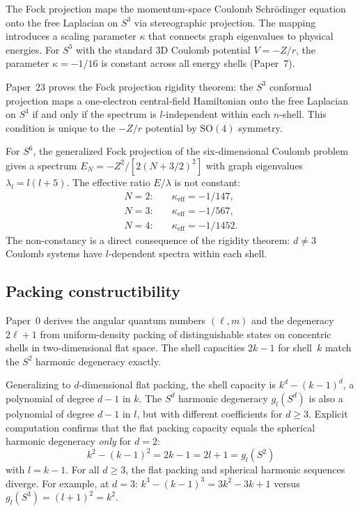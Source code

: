 \documentclass[twocolumn,pra,amsmath,amssymb,superscriptaddress]{revtex4-2}
\begin{document}
The Fock projection maps the momentum-space Coulomb Schr\"odinger
equation onto the free Laplacian on $S^3$ via stereographic
projection.  The mapping introduces a scaling parameter $\kappa$
that connects graph eigenvalues to physical energies.  For $S^3$
with the standard 3D Coulomb potential $V = -Z/r$, the parameter
$\kappa = -1/16$ is constant across all energy shells (Paper~7).

Paper~23 proves the Fock projection rigidity theorem: the $S^3$
conformal projection maps a one-electron central-field Hamiltonian
onto the free Laplacian on $S^3$ if and only if the spectrum is
$l$-independent within each $n$-shell.  This condition is unique
to the $-Z/r$ potential by $\mathrm{SO}(4)$ symmetry.

For $S^6$, the generalized Fock projection of the six-dimensional
Coulomb problem gives a spectrum $E_N = -Z^2/[2(N + 3/2)^2]$ with
graph eigenvalues $\lambda_l = l(l+5)$.  The effective ratio
$E/\lambda$ is not constant:
\begin{align*}
N=2:&\quad \kappa_{\text{eff}} = -1/147, \\
N=3:&\quad \kappa_{\text{eff}} = -1/567, \\
N=4:&\quad \kappa_{\text{eff}} = -1/1452.
\end{align*}
The non-constancy is a direct consequence of the rigidity theorem:
$d \neq 3$ Coulomb systems have $l$-dependent spectra within each
shell.

\subsection{Packing constructibility}

Paper~0 derives the angular quantum numbers $(\ell, m)$ and the
degeneracy $2\ell + 1$ from uniform-density packing of
distinguishable states on concentric shells in two-dimensional
flat space.  The shell capacities $2k - 1$ for shell~$k$ match
the $S^2$ harmonic degeneracy exactly.

Generalizing to $d$-dimensional flat packing, the shell capacity
is $k^d - (k-1)^d$, a polynomial of degree $d-1$ in $k$.  The
$S^d$ harmonic degeneracy $g_l(S^d)$ is also a polynomial of
degree $d-1$ in $l$, but with different coefficients for $d \geq 3$.
Explicit computation confirms that the flat packing capacity equals
the spherical harmonic degeneracy \emph{only} for $d = 2$:
\begin{equation}
k^2 - (k-1)^2 = 2k - 1 = 2l + 1 = g_l(S^2)
\end{equation}
with $l = k - 1$.  For all $d \geq 3$, the flat packing and
spherical harmonic sequences diverge.  For example, at $d = 3$:
$k^3 - (k-1)^3 = 3k^2 - 3k + 1$ versus $g_l(S^3) = (l+1)^2 = k^2$.
\end{document}
